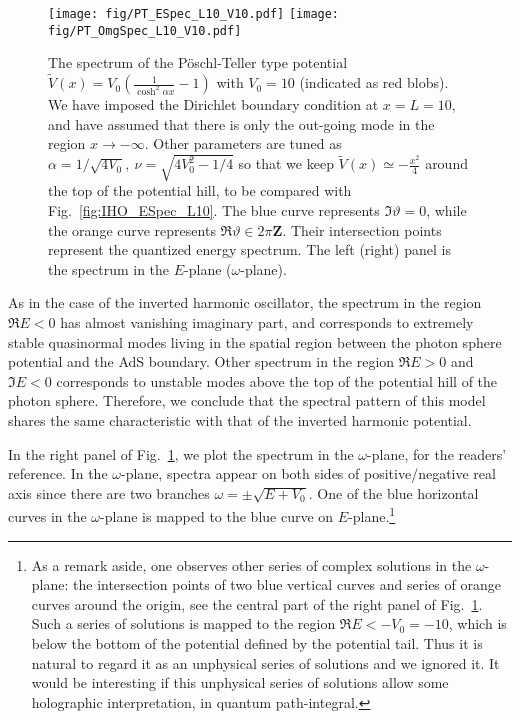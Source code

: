 \documentclass[a4paper,11pt]{article}
\begin{document}
\begin{figure}[t]
    \centering
    \texttt{[image: fig/PT\_ESpec\_L10\_V10.pdf]}
    \texttt{[image: fig/PT\_OmgSpec\_L10\_V10.pdf]}
    \caption{
	The spectrum of the P\"{o}schl-Teller type potential $\widetilde{V}(x)=V_0\left(\frac{1}{\cosh^2\alpha x}-1\right)$ with $V_0=10$ (indicated as red blobs).
        We have imposed the Dirichlet boundary condition at $x=L=10$,
        and have assumed that there is only the out-going mode in the region $x\rightarrow-\infty$.
        Other parameters are tuned as
        $\alpha=1/\sqrt{4V_0},\: \nu=\sqrt{4V_0^2-1/4}$
        so that we keep $\widetilde{V}(x)\simeq-\frac{x^2}{4}$ around the top of the potential hill, to be compared with Fig.~\ref{fig:IHO_ESpec_L10}.
        The blue curve represents $\Im\vartheta=0$,
        while the orange curve represents $\Re\vartheta\in 2\pi\mathbf{Z}$.
        Their intersection points represent the quantized energy spectrum. The left (right) panel is the spectrum in the $E$-plane ($\omega$-plane).
    }
    \label{fig:PT_ESpec_L10_V10}
\end{figure}


As in the case of the inverted harmonic oscillator,
the spectrum in the region $\Re E<0$ has almost vanishing imaginary part, and corresponds to extremely stable quasinormal modes living in the spatial region between the photon sphere potential and the AdS boundary.
Other spectrum in the region $\Re E>0$ and $\Im E<0$ corresponds to unstable modes above the top of the potential hill of the photon sphere.
Therefore, we conclude that the spectral pattern of this model shares the same characteristic with that of the inverted harmonic potential.

In the right panel of Fig.~\ref{fig:PT_ESpec_L10_V10}, we plot the spectrum in the $\omega$-plane, for the readers' reference.
In the $\omega$-plane, spectra appear on both sides of positive/negative real axis since there are two branches $\omega=\pm\sqrt{E+V_0}$.
One of the blue horizontal curves in the $\omega$-plane is mapped to the blue curve on $E$-plane.\footnote{
As a remark aside, one observes other series of complex solutions in the $\omega$-plane: the intersection points of two blue vertical curves and series of orange curves around the origin, see the central part of the right panel of Fig.~\ref{fig:PT_ESpec_L10_V10}.
Such a series of solutions is mapped to the region $\Re E<-V_0=-10$,
which is below the bottom of the potential defined by the potential tail.
Thus it is natural to regard it as an unphysical series of solutions and 
we ignored it.
It would be interesting if this unphysical series of solutions allow some holographic interpretation, in quantum path-integral.
}
\end{document}
